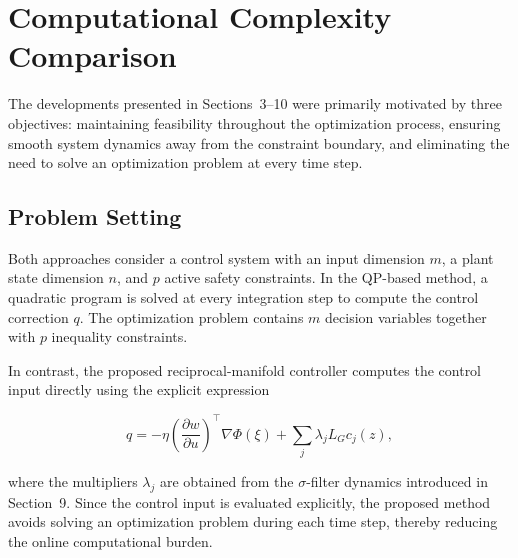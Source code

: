 \documentclass[11pt,onecolumn]{article}
\theoremstyle{definition}
\theoremstyle{remark}
\begin{document}
\section{Computational Complexity Comparison}\label{sec:complexity}

The developments presented in Sections~3--10 were primarily motivated by three objectives: maintaining feasibility throughout the optimization process, ensuring smooth system dynamics away from the constraint boundary, and eliminating the need to solve an optimization problem at every time step.%

\subsection{Problem Setting}

Both approaches consider a control system with an input dimension $m$, a plant state dimension $n$, and $p$ active safety constraints. In the QP-based method, a quadratic program is solved at every integration step to compute the control correction $q$. The optimization problem contains $m$ decision variables together with $p$ inequality constraints.

In contrast, the proposed reciprocal-manifold controller computes the control input directly using the explicit expression

\[
q=-\eta\left(\frac{\partial w}{\partial u}\right)^{\!\top}\nabla\Phi(\xi)
+\sum_{j}\lambda_jL_Gc_j(z),
\]

where the multipliers $\lambda_j$ are obtained from the $\sigma$-filter dynamics introduced in Section~9. Since the control input is evaluated explicitly, the proposed method avoids solving an optimization problem during each time step, thereby reducing the online computational burden.
\end{document}
